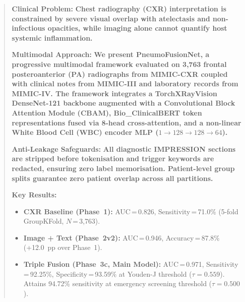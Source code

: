 \documentclass[conference]{IEEEtran}
\begin{document}
\begin{abstract}
\begin{tcolorbox}[
  colback=aisoft!70,
  colframe=aideep,
  arc=3pt,
  boxrule=0.8pt,
  left=5pt,right=5pt,top=5pt,bottom=5pt
]
\noindent\textbf{\textcolor{aideep}{Clinical Problem:}} \textbf{Chest radiography (CXR) interpretation is constrained by severe visual overlap with atelectasis and non-infectious opacities, while imaging alone cannot quantify host systemic inflammation.}

\vspace{3pt}
\noindent\textbf{\textcolor{aideep}{Multimodal Approach:}} \textbf{We present PneumoFusionNet, a progressive multimodal framework evaluated on 3{,}763 frontal posteroanterior (PA) radiographs from MIMIC-CXR coupled with clinical notes from MIMIC-III and laboratory records from MIMIC-IV. The framework integrates a TorchXRayVision DenseNet-121 backbone augmented with a Convolutional Block Attention Module (CBAM), Bio\_ClinicalBERT token representations fused via 8-head cross-attention, and a non-linear White Blood Cell (WBC) encoder MLP ($1 \to 128 \to 128 \to 64$).}

\vspace{3pt}
\noindent\textbf{\textcolor{aideep}{Anti-Leakage Safeguards:}} \textbf{All diagnostic IMPRESSION sections are stripped before tokenisation and trigger keywords are redacted, ensuring zero label memorisation. Patient-level group splits guarantee zero patient overlap across all partitions.}

\vspace{3pt}
\noindent\textbf{\textcolor{aideep}{Key Results:}}
\begin{itemize}[noitemsep,topsep=1pt,leftmargin=*]
  \item \textbf{CXR Baseline (Phase~1):} AUC\,=\,0.826, Sensitivity\,=\,71.0\% (5-fold GroupKFold, $N$\,=\,3{,}763).
  \item \textbf{Image + Text (Phase~2v2):} AUC\,=\,0.946, Accuracy\,=\,87.8\% (+12.0~pp over Phase~1).
  \item \textbf{Triple Fusion (Phase~3c, Main Model):} AUC\,=\,0.971, Sensitivity\,=\,92.25\%, Specificity\,=\,93.59\% at Youden-J threshold ($\tau\!=\!0.559$). Attains 94.72\% sensitivity at emergency screening threshold ($\tau\!=\!0.500$).
\end{itemize}
\end{tcolorbox}
\end{abstract}
\end{document}
